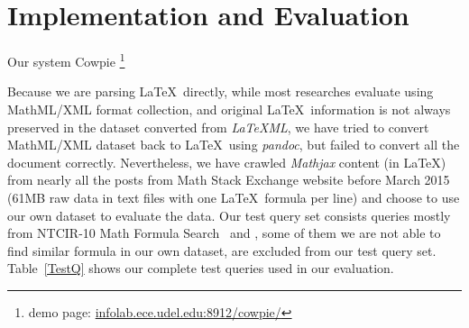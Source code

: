 \chapter{Implementation and Evaluation}

Our system Cowpie \footnote{demo page: \url{infolab.ece.udel.edu:8912/cowpie/}}

Because we are parsing \LaTeX\ directly, while most researches evaluate using MathML/XML format collection, 
and original \LaTeX\ information is not always preserved in the dataset converted from \textit{LaTeXML}, 
we have tried to convert MathML/XML dataset back to \LaTeX\ using \textit{pandoc}, but failed to convert all the document correctly. 
Nevertheless, we have crawled \textit{Mathjax} content (in \LaTeX) from nearly all the posts from Math Stack Exchange website before March 2015 (61MB raw data in text files with one \LaTeX\ formula per line) and choose to use our own dataset to evaluate the data.
Our test query set consists queries mostly from NTCIR-10 Math Formula Search~\cite{ntcirtopic} and \cite{symbolpairs15}, some of them we are not able to find similar formula in our own dataset, are excluded from our test query set.
Table~\ref{TestQ} shows our complete test queries used in our evaluation. 

